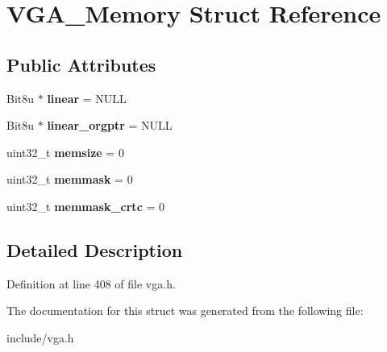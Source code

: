 \hypertarget{structVGA__Memory}{\section{V\-G\-A\-\_\-\-Memory Struct Reference}
\label{structVGA__Memory}
}
\subsection*{Public Attributes}
\begin{DoxyCompactItemize}
\item 
\hypertarget{structVGA__Memory_ad97ba657c0183be121936eeb11436171}{Bit8u $\ast$ {\bfseries linear} = N\-U\-L\-L}\label{structVGA__Memory_ad97ba657c0183be121936eeb11436171}

\item 
\hypertarget{structVGA__Memory_a8b4dbdb74bb5fe961f686c16cae8a11c}{Bit8u $\ast$ {\bfseries linear\-\_\-orgptr} = N\-U\-L\-L}\label{structVGA__Memory_a8b4dbdb74bb5fe961f686c16cae8a11c}

\item 
\hypertarget{structVGA__Memory_aa7ab72d06d3ddb3a945f307865b8d902}{uint32\-\_\-t {\bfseries memsize} = 0}\label{structVGA__Memory_aa7ab72d06d3ddb3a945f307865b8d902}

\item 
\hypertarget{structVGA__Memory_abdbc1c51a3263d179ee67dc7482bf339}{uint32\-\_\-t {\bfseries memmask} = 0}\label{structVGA__Memory_abdbc1c51a3263d179ee67dc7482bf339}

\item 
\hypertarget{structVGA__Memory_ac09f53aaff79d38b002bcf28d04009de}{uint32\-\_\-t {\bfseries memmask\-\_\-crtc} = 0}\label{structVGA__Memory_ac09f53aaff79d38b002bcf28d04009de}

\end{DoxyCompactItemize}


\subsection{Detailed Description}


Definition at line 408 of file vga.\-h.



The documentation for this struct was generated from the following file\-:\begin{DoxyCompactItemize}
\item 
include/vga.\-h\end{DoxyCompactItemize}
